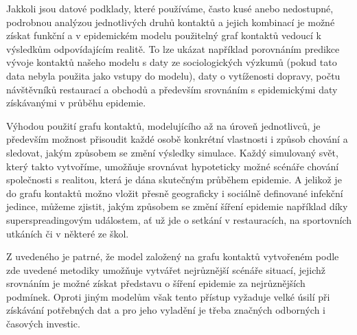 Jakkoli jsou datové podklady, které používáme, často kusé anebo nedostupné, podrobnou analýzou jednotlivých druhů kontaktů a jejich kombinací je možné získat funkční a v epidemickém modelu použitelný graf kontaktů vedoucí k výsledkům odpovídajícím realitě. To lze ukázat například porovnáním predikce vývoje kontaktů našeho modelu s daty ze sociologických výzkumů (pokud tato data nebyla použita jako vstupy do modelu), daty o vytíženosti dopravy, počtu návštěvníků restaurací a obchodů a především srovnáním s epidemickými daty získávanými v průběhu epidemie. 

Výhodou použití grafu kontaktů, modelujícího až na úroveň jednotlivců, je především možnost přisoudit každé osobě konkrétní vlastnosti i způsob chování a sledovat, jakým způsobem se změní výsledky simulace. Každý simulovaný svět, který takto vytvoříme, umožňuje srovnávat hypoteticky možné scénáře chování společnosti s realitou, která je dána skutečným průběhem epidemie. A jelikož je do grafu kontaktů možno vložit přesně geograficky i sociálně definované infekční jedince, můžeme zjistit, jakým způsobem se změní šíření epidemie například díky superspreadingovým událostem, ať už jde o setkání v restauracích, na sportovních utkáních či v některé ze škol. 

Z uvedeného je patrné, že model založený na grafu kontaktů vytvořeném podle zde uvedené metodiky umožňuje vytvářet nejrůznější scénáře situací, jejichž srovnáním je možné získat představu o šíření epidemie za nejrůznějších podmínek. Oproti jiným modelům však tento přístup vyžaduje velké úsilí při získávání potřebných dat a pro jeho vyladění je třeba značných odborných i časových investic.



